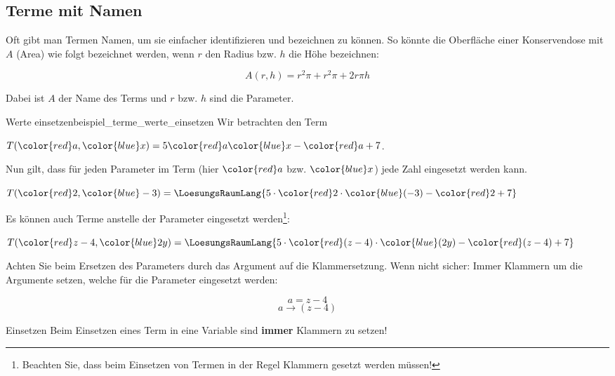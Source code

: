 
\TNTeop{}


\subsection{Terme mit Namen}
Oft gibt man Termen Namen, um sie einfacher identifizieren und
bezeichnen zu können. So könnte \zB die Oberfläche einer
Konservendose mit $A$ (Area) wie folgt bezeichnet werden, wenn $r$ den
Radius bzw. $h$ die Höhe bezeichnen:

$$A(r, h) = r^2\pi + r^2\pi + 2r\pi{}h$$

Dabei ist $A$ der Name des Terms und $r$ bzw. $h$ sind die Parameter.
\vspace{3mm}
\begin{beispiel}{Werte einsetzen}{beispiel_terme_werte_einsetzen}
  Wir betrachten den Term

  $T({\color{red}a}, {\color{blue}x}) = 5{\color{red}a}{\color{blue}x} - {\color{red}a} + 7$.

  Nun gilt, dass für jeden Parameter im Term (hier ${\color{red}a}$
  bzw. ${\color{blue}x}$) jede Zahl eingesetzt
  werden kann.\leserluft{}

  $T({\color{red}2}, {\color{blue}-3}) = \LoesungsRaumLang{5\cdot{}{\color{red}2}\cdot{\color{blue}(-3)} - {\color{red}2} + 7}$

  Es können auch Terme anstelle der Parameter eingesetzt
  werden\footnote{Beachten Sie, dass beim Einsetzen von Termen in der Regel
  Klammern gesetzt werden müssen!}:\leserluft{}

  $T({\color{red}z-4}, {\color{blue}2y}) =
  \LoesungsRaumLang{5 \cdot{} {\color{red}(z-4)} \cdot {\color{blue}(2y)} - {\color{red}(z-4)} + 7}$
\end{beispiel}

\begin{bemerkung}{}{}
Achten Sie beim Ersetzen des Parameters durch das Argument auf die
Klammersetzung. Wenn nicht sicher: Immer Klammern um die Argumente
setzen, welche für die Parameter eingesetzt werden:

$$ a = z-4$$
$$ a  \rightarrow (z-4)$$
\end{bemerkung}

\begin{gesetz}{Einsetzen}{}
  Beim Einsetzen eines Term in eine Variable sind \textbf{immer} Klammern zu setzen!
\end{gesetz}
\newpage

